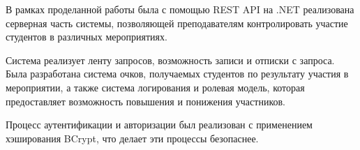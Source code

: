 \conclusion
В рамках проделанной работы была с помощью REST API на .NET реализована серверная часть системы, позволяющей преподавателям контролировать участие студентов в различных мероприятиях.

Система реализует ленту запросов, возможность записи и отписки с запроса. Была разработана система очков, получаемых студентов по результату участия в мероприятии, а также система логирования и ролевая модель, которая предоставляет возможность повышения и понижения участников.

Процесс аутентификации и авторизации был реализован с применением хэширования BCrypt, что делает эти процессы безопаснее.
